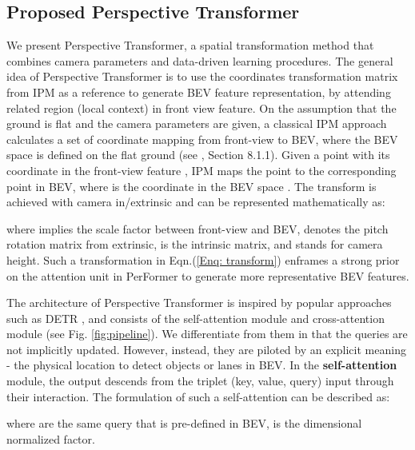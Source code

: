 \documentclass[runningheads]{llncs}
\begin{document}
\subsection{Proposed Perspective Transformer}\label{sec: alg - transformer}
















We present Perspective Transformer, a spatial transformation method that combines camera parameters and data-driven learning procedures.
The general idea of Perspective Transformer is
{to use the coordinates transformation matrix from IPM as a reference to generate BEV feature representation},
by attending related region (local context) in front view feature.
On the assumption that the ground is flat and the camera 
parameters are given, a classical IPM approach calculates a set of coordinate mapping from front-view to BEV, where the BEV space is defined on the flat ground (see \cite{Hartley2004}, Section 8.1.1).
Given a point  with its coordinate  in the front-view feature , IPM maps the point  to the corresponding point  in BEV, where  is the coordinate in the BEV space . 
The transform is achieved with camera in/extrinsic and can be represented mathematically as:

where  implies the scale factor between front-view and BEV,  denotes the pitch rotation matrix from extrinsic,  is the intrinsic matrix, and  stands for camera height.
Such a transformation in Eqn.(\ref{Enq: transform}) enframes a strong prior 
on the attention unit in PerFormer to generate more representative BEV features.




The architecture of Perspective Transformer is inspired by popular approaches such as DETR \cite{carion2020end},  and consists of the self-attention module and cross-attention module (see Fig. \ref{fig:pipeline}).
We differentiate from them in that the queries are not implicitly updated. However, instead, they are piloted by an explicit meaning - the physical location to detect objects or lanes in BEV.
{In the \textbf{self-attention} module, the output  descends from the triplet (key, value, query) input through their interaction.}
The formulation of such a self-attention can be described as:

where  are the same query that is pre-defined in BEV,  is the dimensional normalized factor.
\end{document}
